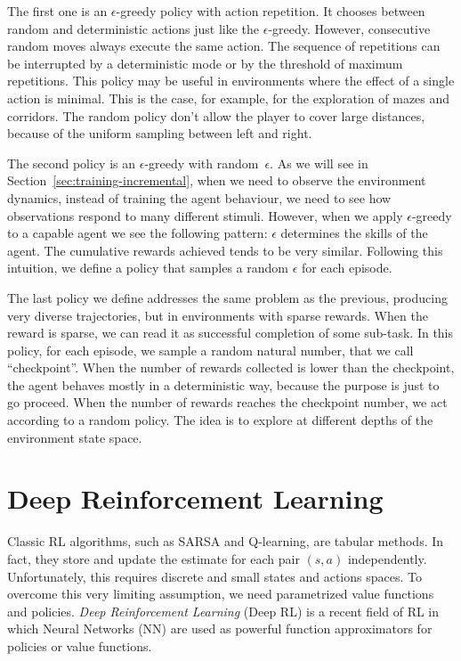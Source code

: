 The first one is an $\epsilon$-greedy policy with action repetition. It
chooses between random and deterministic actions just like the
$\epsilon$-greedy. However, consecutive random moves always execute the same
action. The sequence of repetitions can be interrupted by a deterministic
mode or by the threshold of maximum repetitions. This policy may be useful in
environments where the effect of a single action is minimal. This is the case,
for example, for the exploration of mazes and corridors. The random policy
don't allow the player to cover large distances, because of the uniform
sampling between left and right.

The second policy is an $\epsilon$-greedy with random~$\epsilon$. As we will
see in Section~\ref{sec:training-incremental}, when we need to observe the
environment dynamics, instead of training the agent behaviour, we need to see
how observations respond to many different stimuli. However, when we apply
$\epsilon$-greedy to a capable agent we see the following pattern: $\epsilon$
determines the skills of the agent. The cumulative rewards achieved tends to
be very similar. Following this intuition, we define a policy that samples a
random $\epsilon$ for each episode.

The last policy we define addresses the same problem as the previous,
producing very diverse trajectories, but in environments with sparse rewards.
When the reward is sparse, we can read it as successful completion of some
sub-task. In this policy, for each episode, we sample a random natural number,
that we call ``checkpoint''. When the number of rewards collected is lower
than the checkpoint, the agent behaves mostly in a deterministic way, because
the purpose is just to go proceed. When the number of rewards reaches the
checkpoint number, we act according to a random policy. The idea is to explore
at different depths of the environment state space.


\section{Deep Reinforcement Learning}

\label{sec:deep-rl}

Classic RL algorithms, such as SARSA and Q-learning, are tabular methods.
In fact, they store and update the estimate for each pair $(s, a)$
independently. Unfortunately, this requires discrete and small states and
actions spaces. To overcome this very limiting assumption, we need
parametrized value functions and policies.  \emph{Deep Reinforcement Learning}
(Deep RL) is a recent field of RL in which Neural Networks
(NN) are used as powerful function
approximators for policies or value functions.

